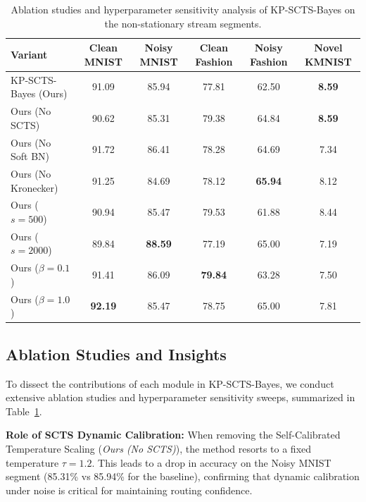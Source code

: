 \documentclass{article}
\theoremstyle{plain}
\theoremstyle{definition}
\theoremstyle{remark}
\begin{document}
\begin{table}[t]
\caption{Ablation studies and hyperparameter sensitivity analysis of KP-SCTS-Bayes on the non-stationary stream segments.}
\label{submission-tab:ablations}
\vskip 0.15in
\begin{center}
\begin{small}
\begin{sc}
\begin{tabular}{lccccc}
\toprule
Variant & Clean MNIST & Noisy MNIST & Clean Fashion & Noisy Fashion & Novel KMNIST \\
\midrule
KP-SCTS-Bayes (Ours) & 91.09 & 85.94 & 77.81 & 62.50 & \textbf{8.59} \\
\midrule
Ours (No SCTS) & 90.62 & 85.31 & 79.38 & 64.84 & \textbf{8.59} \\
Ours (No Soft BN) & 91.72 & 86.41 & 78.28 & 64.69 & 7.34 \\
Ours (No Kronecker) & 91.25 & 84.69 & 78.12 & \textbf{65.94} & 8.12 \\
\midrule
Ours ($s = 500$) & 90.94 & 85.47 & 79.53 & 61.88 & 8.44 \\
Ours ($s = 2000$) & 89.84 & \textbf{88.59} & 77.19 & 65.00 & 7.19 \\
\midrule
Ours ($\beta = 0.1$) & 91.41 & 86.09 & \textbf{79.84} & 63.28 & 7.50 \\
Ours ($\beta = 1.0$) & \textbf{92.19} & 85.47 & 78.75 & 65.00 & 7.81 \\
\bottomrule
\end{tabular}
\end{sc}
\end{small}
\end{center}
\vskip -0.1in
\end{table}

\subsection{Ablation Studies and Insights}
To dissect the contributions of each module in KP-SCTS-Bayes, we conduct extensive ablation studies and hyperparameter sensitivity sweeps, summarized in Table~\ref{submission-tab:ablations}.

\textbf{Role of SCTS Dynamic Calibration:} When removing the Self-Calibrated Temperature Scaling (\textit{Ours (No SCTS)}), the method resorts to a fixed temperature $\tau=1.2$. This leads to a drop in accuracy on the Noisy MNIST segment (85.31\% vs 85.94\% for the baseline), confirming that dynamic calibration under noise is critical for maintaining routing confidence.
\end{document}
